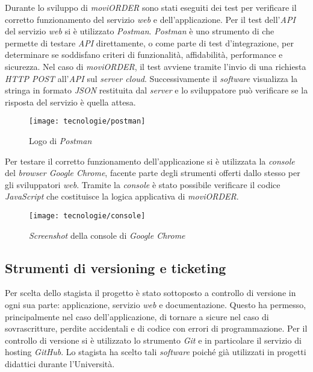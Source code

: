 Durante lo sviluppo di \textit{moviORDER} sono stati eseguiti dei test per verificare il corretto funzionamento del servizio \textit{web} e dell'applicazione. Per il test dell'\textit{API} del servizio \textit{web} si è utilizzato \textit{Postman}. \textit{Postman} è uno strumento di  che permette di testare \textit{API} direttamente, o come parte di test d'integrazione, per determinare se soddisfano criteri di funzionalità, affidabilità, performance e sicurezza. Nel caso di \textit{moviORDER}, il test avviene tramite l'invio di una richiesta \textit{HTTP POST} all'\textit{API} sul \textit{server cloud}. Successivamente il \textit{software} visualizza la stringa in formato \textit{JSON} restituita dal \textit{server} e lo sviluppatore può verificare se la risposta del servizio è quella attesa.

\begin{figure}[!h] 
    \centering 
    \texttt{[image: tecnologie/postman]} 
    \caption{Logo di \textit{Postman}}
\end{figure}

Per testare il corretto funzionamento dell'applicazione si è utilizzata la \textit{console} del \textit{browser Google Chrome}, facente parte degli strumenti offerti dallo stesso per gli sviluppatori \textit{web}. Tramite la \textit{console} è stato possibile verificare il codice \textit{JavaScript} che costituisce la logica applicativa di \textit{moviORDER}.

\begin{figure}[!h] 
    \centering 
    \texttt{[image: tecnologie/console]} 
    \caption{\textit{Screenshot} della console di \textit{Google Chrome}}
\end{figure}

\newpage

\subsection{Strumenti di versioning e ticketing}

Per scelta dello stagista il progetto è stato sottoposto a controllo di versione in ogni sua parte: applicazione, servizio \textit{web} e documentazione. Questo ha permesso, principalmente nel caso dell'applicazione, di tornare a  sicure nel caso di sovrascritture, perdite accidentali e  di codice con errori di programmazione. Per il controllo di versione si è utilizzato lo strumento \textit{Git} e in particolare il servizio di hosting \textit{GitHub}. Lo stagista ha scelto tali \textit{software} poiché già utilizzati in progetti didattici durante l'Università.

